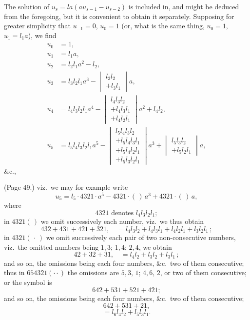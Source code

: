 \documentclass[11pt,a4paper]{article}
\begin{document}
The solution of $u_s = la (a u_{s-1} - u_{s-2})$ is included in, and might be deduced from the foregoing, but it is convenient to obtain it separately. Supposing for greater simplicity that $u_{-1} = 0$, $u_0 = 1$ (or, what is the same thing, $u_0 = 1$, $u_1 = l_1 a$), we find
\begin{align*}
u_0 &= 1, \\
u_1 &= l_1 a, \\
u_2 &= l_2 l_1 a^2 - l_2, \\
u_3 &= l_3 l_2 l_1 a^3 - \begin{vmatrix} l_3 l_2 \\ + l_3 l_1 \end{vmatrix} a, \\
u_4 &= l_4 l_3 l_2 l_1 a^4 - \begin{vmatrix} l_4 l_3 l_2 \\ + l_4 l_3 l_1 \\ + l_4 l_2 l_1 \end{vmatrix} a^2 + l_4 l_2, \\
u_5 &= l_5 l_4 l_3 l_2 l_1 a^5 - \begin{vmatrix} l_5 l_4 l_3 l_2 \\ + l_5 l_4 l_3 l_1 \\ + l_5 l_4 l_2 l_1 \\ + l_5 l_3 l_2 l_1 \end{vmatrix} a^3 + \begin{vmatrix} l_5 l_3 l_2 \\ + l_5 l_2 l_1 \end{vmatrix} a,
\end{align*}
\&c.,

\bigskip

\noindent (Page 49.) viz.\ we may for example write
\[
u_5 = l_5 \cdot 4321 \cdot a^5 - 4321 \cdot (\,) \, a^3 + 4321 \cdot (\,)\,a,
\]
where
\[
4321 \text{ denotes } l_4 l_3 l_2 l_1;
\]
in $4321(\,)$ we omit successively each number, viz.\ we thus obtain
\[
432 + 431 + 421 + 321,\quad = l_4 l_3 l_2 + l_4 l_3 l_1 + l_4 l_2 l_1 + l_3 l_2 l_1\,;
\]
in $4321(\,\cdot\,)$ we omit successively each pair of two non-consecutive numbers, viz.\ the omitted numbers being $1, 3$; $1, 4$; $2, 4$, we obtain
\[
42 + 32 + 31,\quad = l_4 l_2 + l_3 l_2 + l_3 l_1\,;
\]
and so on, the omissions being each four numbers, \&c.\ two of them consecutive; thus in $654321(\cdot \cdot)$ the omissions are $5, 3$, $1$; $4, 6$, $2$, or two of them consecutive; or the symbol is
\[
642 + 531 + 521 + 421;
\]
and so on, the omissions being each four numbers, \&c.\ two of them consecutive;
\[
642 + 531 + 21,
\]
\[
= l_6 l_4 l_2 + l_5 l_3 l_1.
\]
\end{document}
